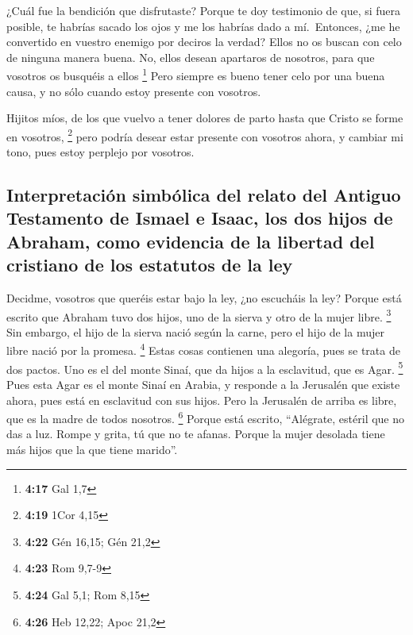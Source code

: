 \begin{paracol}{2}
 ¿Cuál fue la bendición que disfrutaste? Porque te doy
testimonio de que, si fuera posible, te habrías sacado los ojos y me los
habrías dado a mí.  \,Entonces, ¿me he convertido en
vuestro enemigo por deciros la verdad?  Ellos no os
buscan con celo de ninguna manera buena. No, ellos desean apartaros de
nosotros, para que vosotros os busquéis a ellos \footnote{\textbf{4:17}
  Gal 1,7}  Pero siempre es bueno tener celo por una
buena causa, y no sólo cuando estoy presente con vosotros.

 Hijitos míos, de los que vuelvo a tener dolores de parto
hasta que Cristo se forme en vosotros, \footnote{\textbf{4:19} 1Cor 4,15}
 pero podría desear estar presente con vosotros ahora, y
cambiar mi tono, pues estoy perplejo por vosotros.

\hypertarget{interpretaciuxf3n-simbuxf3lica-del-relato-del-antiguo-testamento-de-ismael-e-isaac-los-dos-hijos-de-abraham-como-evidencia-de-la-libertad-del-cristiano-de-los-estatutos-de-la-ley}{%
\subsection{Interpretación simbólica del relato del Antiguo Testamento
de Ismael e Isaac, los dos hijos de Abraham, como evidencia de la
libertad del cristiano de los estatutos de la
ley}\label{interpretaciuxf3n-simbuxf3lica-del-relato-del-antiguo-testamento-de-ismael-e-isaac-los-dos-hijos-de-abraham-como-evidencia-de-la-libertad-del-cristiano-de-los-estatutos-de-la-ley}}

 Decidme, vosotros que queréis estar bajo la ley, ¿no
escucháis la ley?  Porque está escrito que Abraham tuvo
dos hijos, uno de la sierva y otro de la mujer libre. \footnote{\textbf{4:22}
  Gén 16,15; Gén 21,2}  Sin embargo, el hijo de la sierva
nació según la carne, pero el hijo de la mujer libre nació por la
promesa. \footnote{\textbf{4:23} Rom 9,7-9}  Estas cosas
contienen una alegoría, pues se trata de dos pactos. Uno es el del monte
Sinaí, que da hijos a la esclavitud, que es Agar. \footnote{\textbf{4:24}
  Gal 5,1; Rom 8,15}  Pues esta Agar es el monte Sinaí en
Arabia, y responde a la Jerusalén que existe ahora, pues está en
esclavitud con sus hijos.  Pero la Jerusalén de arriba es
libre, que es la madre de todos nosotros. \footnote{\textbf{4:26} Heb
  12,22; Apoc 21,2}  Porque está escrito, ``Alégrate,
estéril que no das a luz. Rompe y grita, tú que no te afanas. Porque la
mujer desolada tiene más hijos que la que tiene marido''.


\end{paracol}
